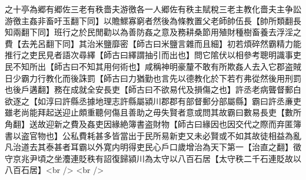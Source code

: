 之十亭為郷有郷佐三老有秩嗇夫游徼各一人郷佐有秩主賦稅三老主教化嗇夫主争訟游徼主姦非畜吁玉翻下同】以贍鰥寡窮者然後為條教置父老師帥伍長【帥所類翻長知兩翻下同】班行之於民閒勸以為善防姦之意及務耕桑節用殖財種樹畜養去浮淫之費【去羌呂翻下同】其治米鹽靡密【師古曰米鹽言雜而且細】初若煩碎然霸精力能推行之吏民見者語次尋繹【師古曰繹謂抽引而出也】問它隂伏以相參考聰明識事吏民不知所出【師古曰不知其用何術也】咸稱神明豪釐不敢有所欺姦人去入它郡盗賊日少霸力行教化而後誅罰【師古曰力猶勤也言先以德教化於下若冇弗從然後用刑罰也後戶遘翻】務在成就全安長吏【師古曰不欲易代及損傷之也】許丞老病聾督郵白欲逐之【如淳曰許縣丞據地理志許縣屬潁川郡郡有部督郵分部屬縣】霸曰許丞亷吏雖老尚能拜起送迎止頗重聽何傷且善助之毋失賢者意或問其故霸曰數易長吏【數所角翻】送故迎新之費及姦吏因緣絶簿書盗財物【師古曰緣因也因交代之際而弃匿簿書以盗官物也】公私費耗甚多皆當出于民所易新吏又未必賢或不如其故徒相益為亂凡治道去其泰甚者耳霸以外寛内明得吏民心戶口歲增治為天下第一【治直之翻】徵守京兆尹頃之坐灋連貶秩有詔復歸潁川為太守以八百石居【太守秩二千石連貶故以八百石居】<br />
<br />
